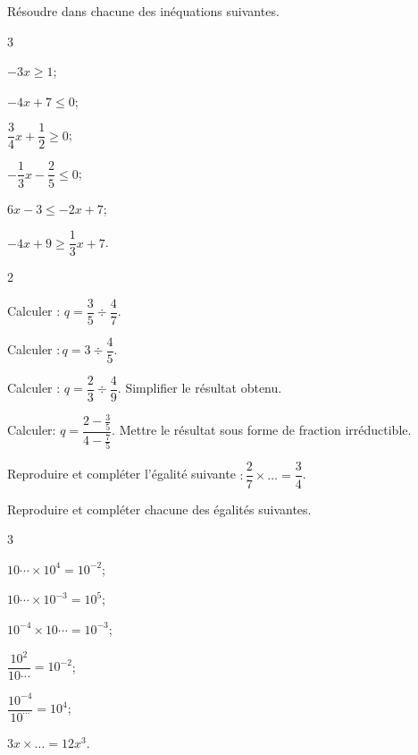 \documentclass[a4paper,10pt]{book}        %
\begin{document}

Résoudre dans \R chacune des inéquations suivantes.
\begin{multicols}{3}
	\begin{enumMet}
	\item $-3 x \geqslant 1$;
	\item $-4 x+7 \leqslant 0$;
	\item $\dfrac{3}{4} x+\dfrac{1}{2} \geqslant 0$;
	\item $-\dfrac{1}{3} x-\dfrac{2}{5} \leqslant 0$;
	\item $6 x-3 \leqslant-2 x+7$;
	\item $-4 x+9 \geqslant \dfrac{1}{3} x+7$.
\end{enumMet}
\end{multicols}


\begin{multicols}{2}
	\begin{enumMet}
	\item Calculer : $q=\dfrac{3}{5}\div \dfrac{4}{7}$.
	\item Calculer $: q=3\div\dfrac{4}{5}$.
	\item Calculer : $q=\dfrac{2}{3}\div\dfrac{4}{9}$. Simplifier le résultat obtenu.
	\item Calculer: $q=\dfrac{2-\frac{3}{5}}{4-\frac{7}{5}}$. Mettre le résultat sous forme de fraction irréductible.
	\item Reproduire et compléter l'égalité suivante $: \dfrac{2}{7} \times \ldots=\dfrac{3}{4}$.
\end{enumMet}
\end{multicols}


Reproduire et compléter chacune des égalités suivantes.
\begin{multicols}{3}
	\begin{enumMet}
	\item $10 \cdots \times 10^{4}=10^{-2}$;
	\item $10 \cdots \times 10^{-3}=10^{5}$;
	\item $10^{-4} \times 10 \cdots=10^{-3}$;
	\item $\dfrac{10^{2}}{10 \cdots}=10^{-2}$;
	\item $\dfrac{10^{-4}}{10^{\cdots}}=10^{4}$;
	\item $3 x \times \ldots=12 x^{3}$.
\end{enumMet}
\end{multicols}
\end{document}
